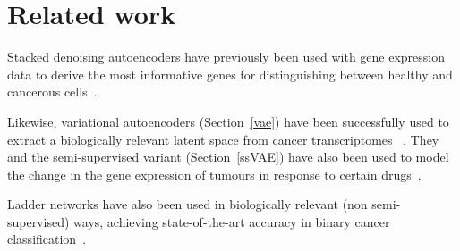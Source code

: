 \section{Related work}

Stacked denoising autoencoders have previously been used with gene expression data to derive the most informative
genes for distinguishing between healthy and cancerous cells~\cite{8217828}.

Likewise, variational autoencoders (Section~\ref{vae}) have been successfully used to extract a biologically relevant latent 
space from cancer transcriptomes ~\cite{Way2018ExtractingAB}. They and the semi-supervised variant (Section~\ref{ssVAE}) 
have also been used to model the change in the gene expression of tumours in response to certain drugs~\cite{10.1093/bioinformatics/btz158}.

Ladder networks have also been used in biologically relevant (non semi-supervised)
ways, achieving state-of-the-art accuracy in binary cancer classification~\cite{10.1007/978-3-319-78723-7_23}.